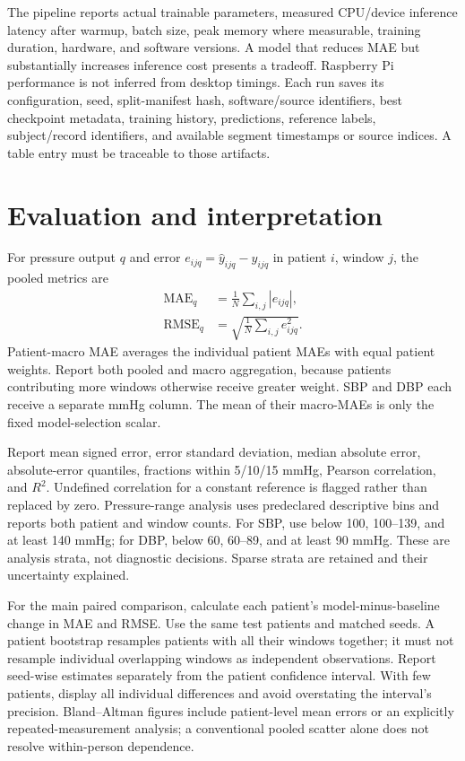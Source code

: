 \documentclass[11pt]{article}
\begin{document}
The pipeline reports actual trainable parameters, measured CPU/device inference latency after warmup, batch size, peak memory where measurable, training duration, hardware, and software versions. A model that reduces MAE but substantially increases inference cost presents a tradeoff. Raspberry Pi performance is not inferred from desktop timings. Each run saves its configuration, seed, split-manifest hash, software/source identifiers, best checkpoint metadata, training history, predictions, reference labels, subject/record identifiers, and available segment timestamps or source indices. A table entry must be traceable to those artifacts.

\section{Evaluation and interpretation}
For pressure output $q$ and error $e_{ijq}=\hat y_{ijq}-y_{ijq}$ in patient $i$, window $j$, the pooled metrics are
\begin{align}
\operatorname{MAE}_q &= \frac{1}{N}\sum_{i,j}|e_{ijq}|,\\
\operatorname{RMSE}_q &= \sqrt{\frac{1}{N}\sum_{i,j}e_{ijq}^2}.
\end{align}
Patient-macro MAE averages the individual patient MAEs with equal patient weights. Report both pooled and macro aggregation, because patients contributing more windows otherwise receive greater weight. SBP and DBP each receive a separate mmHg column. The mean of their macro-MAEs is only the fixed model-selection scalar.

Report mean signed error, error standard deviation, median absolute error, absolute-error quantiles, fractions within 5/10/15 mmHg, Pearson correlation, and $R^2$. Undefined correlation for a constant reference is flagged rather than replaced by zero. Pressure-range analysis uses predeclared descriptive bins and reports both patient and window counts. For SBP, use below 100, 100--139, and at least 140 mmHg; for DBP, below 60, 60--89, and at least 90 mmHg. These are analysis strata, not diagnostic decisions. Sparse strata are retained and their uncertainty explained.

For the main paired comparison, calculate each patient's model-minus-baseline change in MAE and RMSE. Use the same test patients and matched seeds. A patient bootstrap resamples patients with all their windows together; it must not resample individual overlapping windows as independent observations. Report seed-wise estimates separately from the patient confidence interval. With few patients, display all individual differences and avoid overstating the interval's precision. Bland--Altman figures include patient-level mean errors or an explicitly repeated-measurement analysis; a conventional pooled scatter alone does not resolve within-person dependence.
\end{document}
